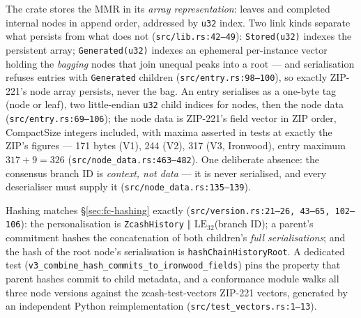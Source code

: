 \documentclass[11pt,a4paper]{article}
\theoremstyle{definition}
\begin{document}
The crate stores the MMR in its \emph{array representation}: leaves and
completed internal nodes in append order, addressed by \texttt{u32}
index. Two link kinds separate what persists from what does not
(\texttt{src/lib.rs:42--49}): \texttt{Stored(u32)} indexes the persistent
array; \texttt{Generated(u32)} indexes an ephemeral per-instance vector
holding the \emph{bagging} nodes that join unequal peaks into a root ---
and serialisation refuses entries with \texttt{Generated} children
(\texttt{src/entry.rs:98--100}), so exactly ZIP-221's node array
persists, never the bag. An entry serialises as a one-byte tag (node or
leaf), two little-endian \texttt{u32} child indices for nodes, then the
node data (\texttt{src/entry.rs:69--106}); the node data is ZIP-221's
field vector in ZIP order, CompactSize integers included, with maxima
asserted in tests at exactly the ZIP's figures --- 171 bytes (V1), 244
(V2), 317 (V3, Ironwood), entry maximum $317 + 9 = 326$
(\texttt{src/node\_data.rs:463--482}). One deliberate absence: the
consensus branch ID is \emph{context, not data} --- it is never
serialised, and every deserialiser must supply it
(\texttt{src/node\_data.rs:135--139}).

Hashing matches \S\ref{sec:fc-hashing} exactly
(\texttt{src/version.rs:21--26, 43--65, 102--106}): the personalisation
is \texttt{ZcashHistory} $\Vert$ $\mathrm{LE}_{32}$(branch ID); a
parent's commitment hashes the concatenation of both children's
\emph{full serialisations}; and the hash of the root node's serialisation
is \texttt{hashChainHistoryRoot}. A dedicated test
(\texttt{v3\_combine\_hash\_commits\_to\_ironwood\_fields}) pins the
property that parent hashes commit to child metadata, and a conformance
module walks all three node versions against the
\textsf{zcash-test-vectors} ZIP-221 vectors, generated by an independent
Python reimplementation (\texttt{src/test\_vectors.rs:1--13}).
\end{document}
